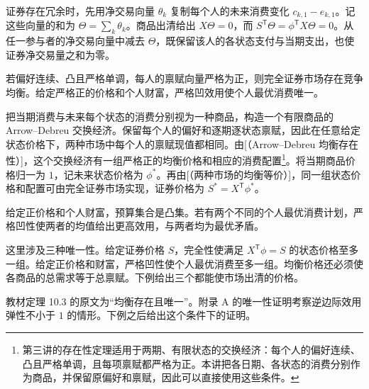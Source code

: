 证券存在冗余时，先用净交易向量 $\theta_k$ 复制每个人的未来消费变化 $c_{k,1}-e_{k,1}$。记这些向量的和为 $\Theta=\sum_k\theta_k$。商品出清给出 $X\Theta=0$，而 $S^{\mathsf T}\Theta=\phi^{\mathsf T}X\Theta=0$。从任一参与者的净交易向量中减去 $\Theta$，既保留该人的各状态支付与当期支出，也使证券净交易量之和为零。

\begin{tcolorbox}[knowledge]
 若偏好连续、凸且严格单调，每人的禀赋向量严格为正，则完全证券市场存在竞争均衡。给定严格正的价格和个人财富，严格凹效用使个人最优消费唯一。
\end{tcolorbox}

\begin{solution}[label-content={证明},blank-type=none]
把当期消费与未来每个状态的消费分别视为一种商品，构造一个有限商品的 Arrow--Debreu 交换经济。保留每个人的偏好和逐期逐状态禀赋，因此在任意给定状态价格下，两种市场中每个人的禀赋现值都相同。由[（Arrow--Debreu 均衡存在性）]，这个交换经济有一组严格正的均衡价格和相应的消费配置\footnote{第三讲的存在性定理适用于两期、有限状态的交换经济：每个人的偏好连续、凸且严格单调，且每项禀赋都严格为正。本讲把各日期、各状态的消费分别作为商品，并保留原偏好和禀赋，因此可以直接使用这些条件。}。将当期商品价格归一为 $1$，记未来状态价格为 $\phi^*$。再由[（两种市场的均衡等价）]，同一组状态价格和配置可由完全证券市场实现，证券价格为 $S^*=X^{\mathsf T}\phi^*$。

给定正价格和个人财富，预算集合是凸集。若有两个不同的个人最优消费计划，严格凹性使两者的均值给出更高效用，与两者均为最优矛盾。
\end{solution}

这里涉及三种唯一性。给定证券价格 $S$，完全性使满足 $X^{\mathsf T}\phi=S$ 的状态价格至多一组。给定正价格和财富，严格凹性使个人最优消费至多一组。均衡价格还必须使各商品的总需求等于总禀赋。下例给出三个都能使市场出清的价格。

教材定理 10.3 的原文为“均衡存在且唯一”。附录 A 的唯一性证明考察逆边际效用弹性不小于 $1$ 的情形。下例之后给出这个条件下的证明。


